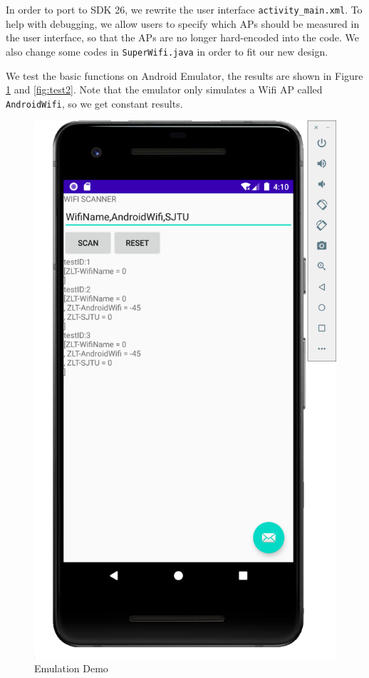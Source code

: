 In order to port to SDK 26, we rewrite the user interface \texttt{activity\_main.xml}. To help with debugging, we allow users to specify which APs should be measured in the user interface, so that the APs are no longer hard-encoded into the code. We also change some codes in \texttt{SuperWifi.java} in order to fit our new design.

We test the basic functions on Android Emulator, the results are shown in Figure \ref{fig:test1} and \ref{fig:test2}. Note that the emulator only simulates a Wifi AP called \texttt{AndroidWifi}, so we get constant results.



\begin{figure}[t]
  \centering
  \begin{minipage}[t]{0.48\linewidth}
  \centering
    \caption{Emulation Demo}
    \label{fig:test1}
    \includegraphics[width=0.8\columnwidth]{img/test1.png} 

\end{minipage}
\end{figure}
